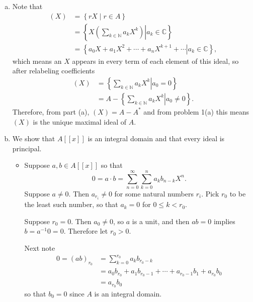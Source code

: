 \documentclass{article}
\begin{document}
\begin{Answer}
\begin{enumerate}[(a)]
{    }
    \item{
      Note that
      \begin{align*}
         (X)
      &= \left\{ r X \mid r \in A \right\} \\
      &= \left\{
           \left.
             X
             \left(
               \sum_{k \in \mathbb{N}} a_k X^k
             \right)
           \right|
             a_k \in \mathbb{C}
         \right\} \\
      &= \left\{
           \left.
             a_0 X + a_1 X^2 + \cdots + a_n X^{k+1} + \cdots
           \right|
             a_{k} \in \mathbb{C}
         \right\},
      \end{align*}
      which means an $X$ appears in every term of each element of this
      ideal, so after relabeling coefficients
      \begin{align*}
         (X)
      &= \left\{
           \left.
             \sum_{k \in \mathbb{N}} a_k X^k
           \right|
             a_0 = 0
         \right\} \\
      &= A -
         \left\{
           \left.
             \sum_{k \in \mathbb{N}} a_k X^k
           \right|
             a_0 \neq 0
         \right\}.
      \end{align*}
      Therefore, from part (a), $(X) = A - A^\ast$
      and from problem 1(a) this means $(X)$ is the unique maximal
      ideal of $A$.
    }
    \item{
      We show that $A[[x]]$ is an integral domain and that every ideal
      is principal.
      \begin{itemize}
        \item{
          Suppose $a, b \in A[[x]]$ so that
          $$
          0 = a \cdot b = \sum_{n=0}^\infty \sum_{k=0}^n a_k b_{n-k} X^n.
          $$
          Suppose $a \neq 0$. Then $a_{r_i} \neq 0$ for some
          natural numbers $r_i$. Pick $r_0$ to be the least such number,
          so that $a_{k} = 0$ for $0 \leq k < r_0$.

          Suppose $r_0 = 0$. Then $a_0 \neq 0$, so $a$ is a unit, and
          then $ab = 0$ implies $b = a^{-1} 0 = 0$. Therefore let $r_0
          > 0$.

          Next note
          \begin{align*}
           0 = (ab)_{r_0}
            &= \sum_{k=0}^{r_0} a_k b_{r_0 - k} \\
            &= a_0 b_{r_0}
             + a_1 b_{r_0 - 1}
             + \cdots
             + a_{r_0 - 1} b_1
             + a_{r_0} b_0 \\
            &= a_{r_0} b_0
          \end{align*}
          so that $b_0 = 0$ since $A$ is an integral domain.

}
\end{itemize}}
\end{enumerate}
\end{Answer}
\end{document}
